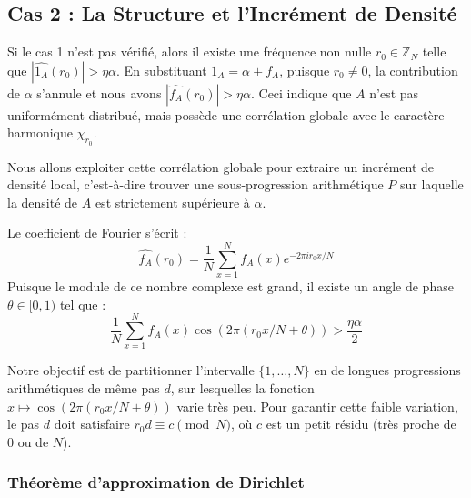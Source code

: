 \documentclass[12pt, a4paper]{article}
\begin{document}
\subsection{Cas 2 : La Structure et l'Incrément de Densité}

Si le cas 1 n'est pas vérifié, alors il existe une fréquence non nulle $r_0 \in \mathbb{Z}_N$ telle que $|\widehat{1_A}(r_0)| > \eta \alpha$. En substituant $1_A = \alpha + f_A$, puisque $r_0 \neq 0$, la contribution de $\alpha$ s'annule et nous avons $|\widehat{f_A}(r_0)| > \eta \alpha$.
Ceci indique que $A$ n'est pas uniformément distribué, mais possède une corrélation globale avec le caractère harmonique $\chi_{r_0}$.

Nous allons exploiter cette corrélation globale pour extraire un incrément de densité local, c'est-à-dire trouver une sous-progression arithmétique $P$ sur laquelle la densité de $A$ est strictement supérieure à $\alpha$.

Le coefficient de Fourier s'écrit :
\begin{equation}
\widehat{f_A}(r_0) = \frac{1}{N} \sum_{x = 1}^{N} f_A(x) e^{-2\pi i r_0 x / N}
\end{equation}
Puisque le module de ce nombre complexe est grand, il existe un angle de phase $\theta \in [0, 1)$ tel que :
\begin{equation}
\label{eq:correlation_reelle}
\frac{1}{N} \sum_{x = 1}^{N} f_A(x) \cos(2\pi (r_0 x / N + \theta)) > \frac{\eta \alpha}{2}
\end{equation}

Notre objectif est de partitionner l'intervalle $\{1, \dots, N\}$ en de longues progressions arithmétiques de même pas $d$, sur lesquelles la fonction $x \mapsto \cos(2\pi (r_0 x / N + \theta))$ varie très peu.
Pour garantir cette faible variation, le pas $d$ doit satisfaire $r_0 d \equiv c \pmod N$, où $c$ est un petit résidu (très proche de 0 ou de $N$).

\subsubsection{Théorème d'approximation de Dirichlet}
\end{document}
